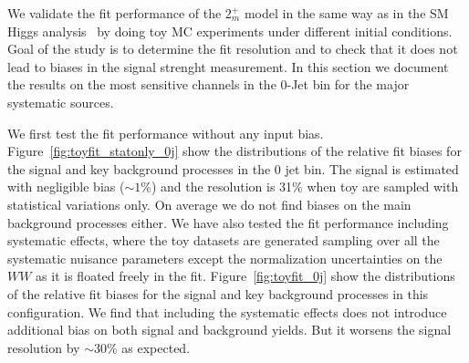 We validate the fit performance of the $2_m^+$ model in the same way as in the SM Higgs analysis~\cite{HWWMoriond2013} by 
doing toy MC experiments under different initial conditions.
Goal of the study is to determine the fit resolution and to check that it does not lead to 
biases in the signal strenght measurement. 
In this section we document the results on the most sensitive channels in the 0-Jet bin for the major systematic sources. 

We first test the fit performance without any input bias. 
Figure~\ref{fig:toyfit_statonly_0j} show the distributions of the relative fit biases 
for the signal and key background processes in the 0 jet bin. 
The signal is estimated with negligible bias ($\sim 1$\%) and the resolution is 31\% 
when toy are sampled with statistical variations only. 
On average we do not find biases on the main background processes either. 
We have also tested the fit performance including systematic effects, where the 
toy datasets are generated sampling over all the systematic nuisance parameters except the normalization 
uncertainties on the $WW$ as it is floated freely in the fit. 
Figure~\ref{fig:toyfit_0j} show the distributions of the relative fit biases 
for the signal and key background processes in this configuration.  
We find that including the systematic effects does not introduce additional bias on both 
signal and background yields. But it worsens the signal resolution by $\sim$30\% as expected.  


